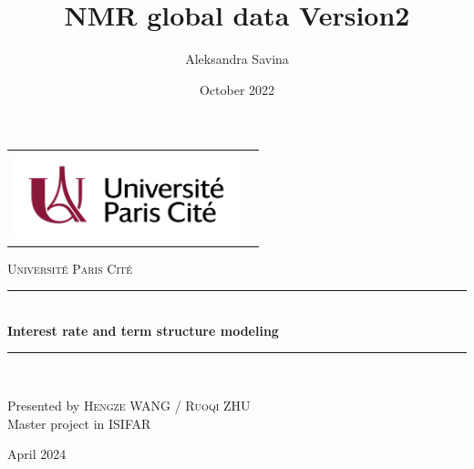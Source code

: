 \documentclass[a4paper,12pt,twoside,french]{book}
[a4paper,12pt,twoside]
\title{NMR global data Version2}
\author{Aleksandra Savina}
\date{October 2022}
\begin{document}
	\begin{titlepage}
		\begin{center}
			\begin{tabular}{c@{\hskip 7cm}c@{\hskip 1cm}}
				\includegraphics[height=2.5cm]{figures/PageTitre/UParisCitelogo.jpg} &
			\end{tabular}
		\end{center}
	
		\begin{center}
		
\vspace*{.03\textheight}
\textsc{\LARGE Université Paris Cité}\\[0.2cm] %
		
  
  			\vfill
 
	 		\rule{\textwidth}{0.8pt} \\ %
	 		\vspace{10pt}
	 		 { \LARGE \bfseries Interest rate and term structure modeling \textit{}} %
	 		 \vspace{10pt}
	 		 \rule{\textwidth}{0.8pt} \\ %
		\end{center}
		
		\vfill
		\begin{center}
			Presented by \textsc{\Large Hengze WANG / Ruoqi ZHU}\\[1cm] 
			Master project in \textsc{\large \large ISIFAR}\\[1cm]
		
	
			
			\vspace{1cm}
	
			April 2024
		\end{center}
		
		\vspace{1cm}

	\newpage %
	\thispagestyle{empty} %
	\end{titlepage}
\end{document}
